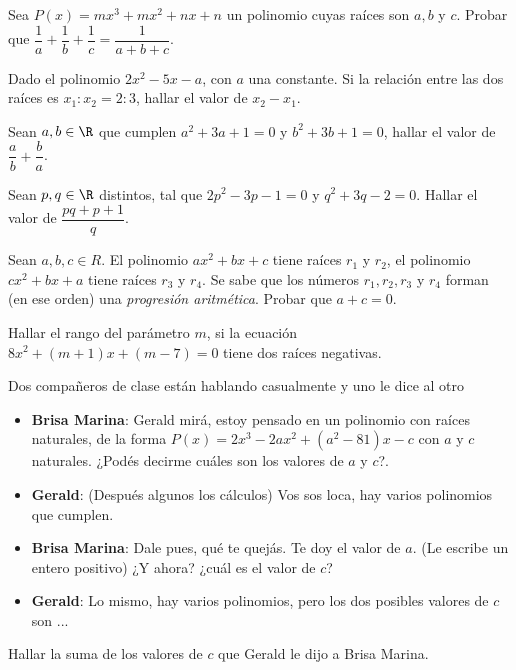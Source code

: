 \begin{multicols}{2}
    \begin{problem}
        Sea $P(x) = mx^3 + mx^2 + nx + n$ un polinomio cuyas raíces son $a, b$ y $c$.
        Probar que $\dfrac{1}{a} + \dfrac{1}{b} + \dfrac{1}{c} = \dfrac{1}{a + b + c}$.
    \end{problem}

    \begin{problem}
        Dado el polinomio $2x^2 - 5x - a$, con $a$ una constante.
        Si la relación entre las dos raíces es $x_1 : x_2 = 2 : 3$, hallar el valor de $x_2 - x_1$.
    \end{problem}

    \begin{problem}
        Sean $a, b \in \R$ que cumplen $a^2 + 3a + 1 = 0$ y $b^2 + 3b + 1 = 0$, hallar el valor de $\dfrac{a}{b} + \dfrac{b}{a}$.
    \end{problem}

    \begin{problem}
        Sean $p, q \in \R$ distintos, tal que $2p^2 - 3p - 1 = 0$ y $q^2 + 3q - 2 = 0$.
        Hallar el valor de $\dfrac{pq + p + 1}{q}$.
    \end{problem}

    \begin{problem}
        Sean $a, b, c \in R$.
        El polinomio $ax^2 + bx + c$ tiene raíces $r_1$ y $r_2$, el polinomio $cx^2 + bx + a$ tiene raíces $r_3$ y $r_4$.
        Se sabe que los números $r_1, r_2, r_3$ y $r_4$ forman (en ese orden) una \textit{progresión aritmética}.
        Probar que $a + c = 0.$
    \end{problem}

    \begin{problem}
        Hallar el rango del parámetro $m$, si la ecuación $8x^2 + (m + 1)x + (m - 7) = 0$ tiene dos raíces negativas.
    \end{problem}

    \begin{problem}
        Dos compañeros de clase están hablando casualmente y uno le dice al otro
        \begin{itemize}
            \item \textbf{Brisa Marina}: Gerald mirá, estoy pensado en un polinomio con raíces naturales, de la forma
            $P(x) = 2x^3 - 2ax^2 + (a^2 - 81)x - c$ con $a$ y $c$ naturales.
            ¿Podés decirme cuáles son los valores de $a$ y $c$?.
            \item \textbf{Gerald}: (Después algunos los cálculos) Vos sos loca, hay varios polinomios que cumplen.
            \item \textbf{Brisa Marina}: Dale pues, qué te quejás.
            Te doy el valor de $a$.
            (Le escribe un entero positivo) ¿Y ahora? ¿cuál es el valor de $c$?
            \item \textbf{Gerald}: Lo mismo, hay varios polinomios, pero los dos posibles valores de $c$ son ...
        \end{itemize}
        Hallar la suma de los valores de $c$ que Gerald le dijo a Brisa Marina.
    \end{problem}


\end{multicols}
